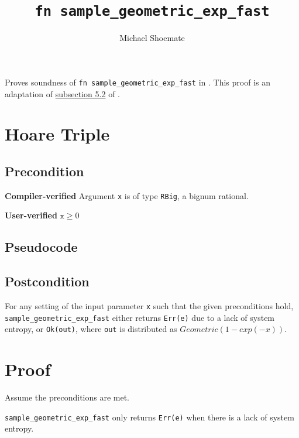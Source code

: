 \documentclass{article}
\title{\texttt{fn sample\_geometric\_exp\_fast}}
\author{Michael Shoemate}
\begin{document}
 
\maketitle 
 
Proves soundness of \texttt{fn sample\_geometric\_exp\_fast} in . 
This proof is an adaptation of \href{https://arxiv.org/pdf/2004.00010.pdf#subsection.5.2}{subsection 5.2} of \cite{CKS20}. 
 
\section{Hoare Triple} 
 
\subsection*{Precondition} 
\textbf{Compiler-verified} 
Argument \texttt{x} is of type \texttt{RBig}, a bignum rational. 
 
\textbf{User-verified} 
$\texttt{x} \geq 0$ 
 
\subsection*{Pseudocode}         
 
 
\subsection*{Postcondition} 
\label{postcondition} 
For any setting of the input parameter \texttt{x} such that the given preconditions hold, \\ 
\texttt{sample\_geometric\_exp\_fast} either returns \texttt{Err(e)} due to a lack of system entropy, 
or \texttt{Ok(out)}, where \texttt{out} is distributed as $Geometric(1 - exp(-x))$. 
 
\section{Proof} 
Assume the preconditions are met. 
 
\begin{lemma}\label{err-e} 
    \texttt{sample\_geometric\_exp\_fast} only returns \texttt{Err(e)} when there is a lack of system entropy. 
\end{lemma} 
 
\end{document}
